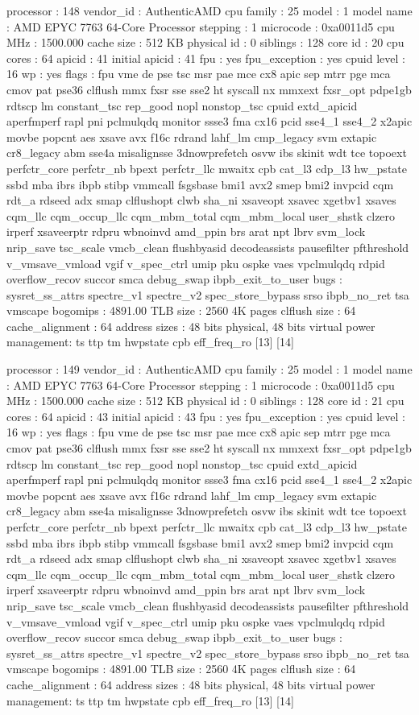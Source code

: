 processor	: 148
vendor_id	: AuthenticAMD
cpu family	: 25
model		: 1
model name	: AMD EPYC 7763 64-Core Processor
stepping	: 1
microcode	: 0xa0011d5
cpu MHz		: 1500.000
cache size	: 512 KB
physical id	: 0
siblings	: 128
core id		: 20
cpu cores	: 64
apicid		: 41
initial apicid	: 41
fpu		: yes
fpu_exception	: yes
cpuid level	: 16
wp		: yes
flags		: fpu vme de pse tsc msr pae mce cx8 apic sep mtrr pge mca cmov pat pse36 clflush mmx fxsr sse sse2 ht syscall nx mmxext fxsr_opt pdpe1gb rdtscp lm constant_tsc rep_good nopl nonstop_tsc cpuid extd_apicid aperfmperf rapl pni pclmulqdq monitor ssse3 fma cx16 pcid sse4_1 sse4_2 x2apic movbe popcnt aes xsave avx f16c rdrand lahf_lm cmp_legacy svm extapic cr8_legacy abm sse4a misalignsse 3dnowprefetch osvw ibs skinit wdt tce topoext perfctr_core perfctr_nb bpext perfctr_llc mwaitx cpb cat_l3 cdp_l3 hw_pstate ssbd mba ibrs ibpb stibp vmmcall fsgsbase bmi1 avx2 smep bmi2 invpcid cqm rdt_a rdseed adx smap clflushopt clwb sha_ni xsaveopt xsavec xgetbv1 xsaves cqm_llc cqm_occup_llc cqm_mbm_total cqm_mbm_local user_shstk clzero irperf xsaveerptr rdpru wbnoinvd amd_ppin brs arat npt lbrv svm_lock nrip_save tsc_scale vmcb_clean flushbyasid decodeassists pausefilter pfthreshold v_vmsave_vmload vgif v_spec_ctrl umip pku ospke vaes vpclmulqdq rdpid overflow_recov succor smca debug_swap ibpb_exit_to_user
bugs		: sysret_ss_attrs spectre_v1 spectre_v2 spec_store_bypass srso ibpb_no_ret tsa vmscape
bogomips	: 4891.00
TLB size	: 2560 4K pages
clflush size	: 64
cache_alignment	: 64
address sizes	: 48 bits physical, 48 bits virtual
power management: ts ttp tm hwpstate cpb eff_freq_ro [13] [14]

processor	: 149
vendor_id	: AuthenticAMD
cpu family	: 25
model		: 1
model name	: AMD EPYC 7763 64-Core Processor
stepping	: 1
microcode	: 0xa0011d5
cpu MHz		: 1500.000
cache size	: 512 KB
physical id	: 0
siblings	: 128
core id		: 21
cpu cores	: 64
apicid		: 43
initial apicid	: 43
fpu		: yes
fpu_exception	: yes
cpuid level	: 16
wp		: yes
flags		: fpu vme de pse tsc msr pae mce cx8 apic sep mtrr pge mca cmov pat pse36 clflush mmx fxsr sse sse2 ht syscall nx mmxext fxsr_opt pdpe1gb rdtscp lm constant_tsc rep_good nopl nonstop_tsc cpuid extd_apicid aperfmperf rapl pni pclmulqdq monitor ssse3 fma cx16 pcid sse4_1 sse4_2 x2apic movbe popcnt aes xsave avx f16c rdrand lahf_lm cmp_legacy svm extapic cr8_legacy abm sse4a misalignsse 3dnowprefetch osvw ibs skinit wdt tce topoext perfctr_core perfctr_nb bpext perfctr_llc mwaitx cpb cat_l3 cdp_l3 hw_pstate ssbd mba ibrs ibpb stibp vmmcall fsgsbase bmi1 avx2 smep bmi2 invpcid cqm rdt_a rdseed adx smap clflushopt clwb sha_ni xsaveopt xsavec xgetbv1 xsaves cqm_llc cqm_occup_llc cqm_mbm_total cqm_mbm_local user_shstk clzero irperf xsaveerptr rdpru wbnoinvd amd_ppin brs arat npt lbrv svm_lock nrip_save tsc_scale vmcb_clean flushbyasid decodeassists pausefilter pfthreshold v_vmsave_vmload vgif v_spec_ctrl umip pku ospke vaes vpclmulqdq rdpid overflow_recov succor smca debug_swap ibpb_exit_to_user
bugs		: sysret_ss_attrs spectre_v1 spectre_v2 spec_store_bypass srso ibpb_no_ret tsa vmscape
bogomips	: 4891.00
TLB size	: 2560 4K pages
clflush size	: 64
cache_alignment	: 64
address sizes	: 48 bits physical, 48 bits virtual
power management: ts ttp tm hwpstate cpb eff_freq_ro [13] [14]

